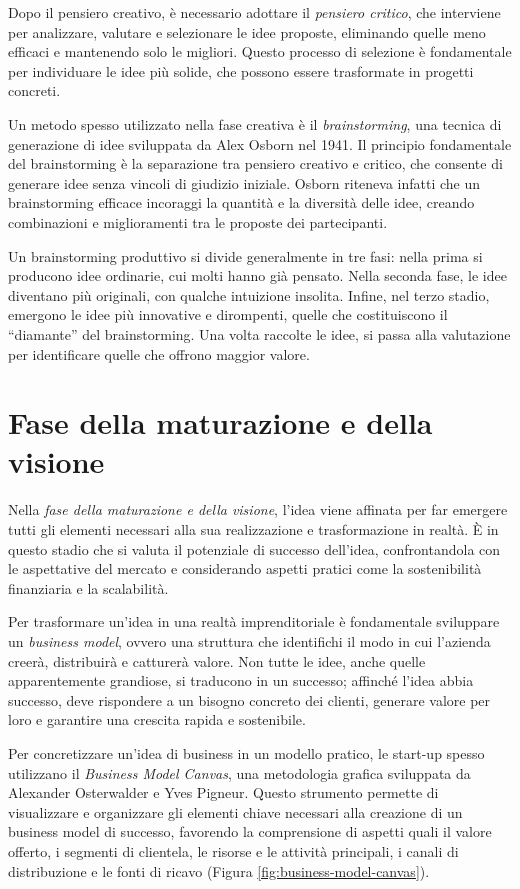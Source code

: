 Dopo il pensiero creativo, è necessario adottare il \textit{pensiero critico}, che interviene per analizzare, valutare e selezionare le idee proposte, eliminando quelle meno efficaci e mantenendo solo le migliori. Questo processo di selezione è fondamentale per individuare le idee più solide, che possono essere trasformate in progetti concreti.

Un metodo spesso utilizzato nella fase creativa è il \textit{brainstorming}, una tecnica di generazione di idee sviluppata da Alex Osborn nel 1941. Il principio fondamentale del brainstorming è la separazione tra pensiero creativo e critico, che consente di generare idee senza vincoli di giudizio iniziale. Osborn riteneva infatti che un brainstorming efficace incoraggi la quantità e la diversità delle idee, creando combinazioni e miglioramenti tra le proposte dei partecipanti.

Un brainstorming produttivo si divide generalmente in tre fasi: nella prima si producono idee ordinarie, cui molti hanno già pensato. Nella seconda fase, le idee diventano più originali, con qualche intuizione insolita. Infine, nel terzo stadio, emergono le idee più innovative e dirompenti, quelle che costituiscono il “diamante” del brainstorming. Una volta raccolte le idee, si passa alla valutazione per identificare quelle che offrono maggior valore.

\section{Fase della maturazione e della visione}
Nella \textit{fase della maturazione e della visione}, l'idea viene affinata per far emergere tutti gli elementi necessari alla sua realizzazione e trasformazione in realtà. È in questo stadio che si valuta il potenziale di successo dell'idea, confrontandola con le aspettative del mercato e considerando aspetti pratici come la sostenibilità finanziaria e la scalabilità.

Per trasformare un’idea in una realtà imprenditoriale è fondamentale sviluppare un \textit{business model}, ovvero una struttura che identifichi il modo in cui l'azienda creerà, distribuirà e catturerà valore. Non tutte le idee, anche quelle apparentemente grandiose, si traducono in un successo; affinché l’idea abbia successo, deve rispondere a un bisogno concreto dei clienti, generare valore per loro e garantire una crescita rapida e sostenibile.

Per concretizzare un'idea di business in un modello pratico, le start-up spesso utilizzano il \textit{Business Model Canvas}, una metodologia grafica sviluppata da Alexander Osterwalder e Yves Pigneur. Questo strumento permette di visualizzare e organizzare gli elementi chiave necessari alla creazione di un business model di successo, favorendo la comprensione di aspetti quali il valore offerto, i segmenti di clientela, le risorse e le attività principali, i canali di distribuzione e le fonti di ricavo (Figura \ref{fig:business-model-canvas}).

